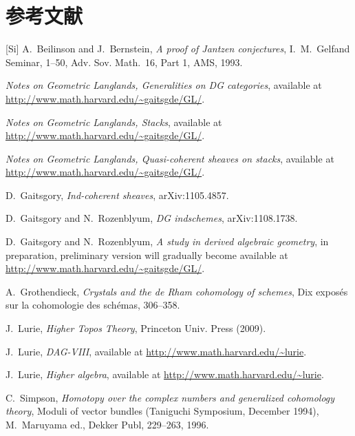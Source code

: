 \chapter*{参考文献}

\begin{thebibliography}{[Si]}
 A.~Beilinson and J.~Bernstein, \emph{A proof of Jantzen conjectures}, I.~M.~Gelfand Seminar, 1--50, Adv. Sov. Math.~16, Part 1, AMS, 1993.

 \emph{Notes on Geometric Langlands, Generalities on DG categories}, available at \url{http://www.math.harvard.edu/~gaitsgde/GL/}.

 \emph{Notes on Geometric Langlands, Stacks}, available at \url{http://www.math.harvard.edu/~gaitsgde/GL/}.

 \emph{Notes on Geometric Langlands, Quasi-coherent sheaves on stacks}, available at \url{http://www.math.harvard.edu/~gaitsgde/GL/}.

 D.~Gaitsgory, \emph{Ind-coherent sheaves}, arXiv:1105.4857.

 D.~Gaitsgory and N.~Rozenblyum, \emph{DG indschemes}, arXiv:1108.1738.

 D.~Gaitsgory and N.~Rozenblyum, \emph{A study in derived algebraic geometry}, in preparation, preliminary version will gradually become available at \url{http://www.math.harvard.edu/~gaitsgde/GL/}.

 A.~Grothendieck, \emph{Crystals and the de Rham cohomology of schemes}, Dix expos\'es sur la cohomologie des sch\'emas, 306--358.

 J.~Lurie, \emph{Higher Topos Theory}, Princeton Univ. Press (2009).

 J.~Lurie, \emph{DAG-VIII}, available at \url{http://www.math.harvard.edu/~lurie}.

 J.~Lurie, \emph{Higher algebra}, available at \url{http://www.math.harvard.edu/~lurie}.

 C.~Simpson, \emph{Homotopy over the complex numbers and generalized cohomology theory}, Moduli of vector bundles (Taniguchi Symposium, December 1994), M.~Maruyama ed., Dekker Publ, 229--263, 1996.
\end{thebibliography}
